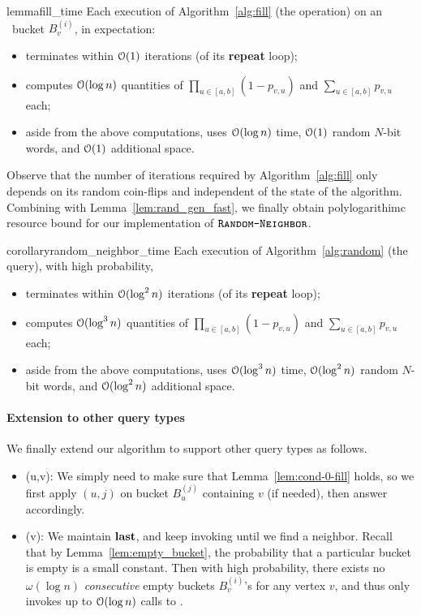 \begin{restatable}{lemma}{fill_time}
\label{lem:fill_time}
Each execution of Algorithm~\ref{alg:fill} (the  operation) on an \unfilled~bucket $B_v^{(i)}$, in expectation:
\begin{itemize}
\item terminates within $\mathcal{O}(1)$ iterations (of its \textup{\textbf{repeat}} loop);
\item computes $\mathcal{O}(\log n)$ quantities of $\prod_{u \in [a,b]} (1-p_{v,u})$ and $\sum_{u\in[a,b]} p_{v,u}$ each;
\item aside from the above computations, uses $\mathcal{O}(\log n)$ time, $\mathcal{O}(1)$ random $N$-bit words, and $\mathcal{O}(1)$ additional space.
\end{itemize}
\end{restatable}

Observe that the number of iterations required by Algorithm~\ref{alg:fill} only depends on its random coin-flips and independent of the state of the algorithm.
Combining with Lemma~\ref{lem:rand_gen_fast}, we finally obtain polylogarithimc resource bound for our implementation of $\texttt{\textsc{Random-Neighbor}}$.

\begin{restatable}{corollary}{random_neighbor_time}
\label{cor:random_neighbor_time}
Each execution of Algorithm~\ref{alg:random} (the  query), with high probability,
\begin{itemize}
\item terminates within $\mathcal{O}(\log^2 n)$ iterations (of its \textup{\textbf{repeat}} loop);
\item computes $\mathcal{O}(\log^3 n)$ quantities of $\prod_{u \in [a,b]} (1-p_{v,u})$ and $\sum_{u\in[a,b]} p_{v,u}$ each;
\item aside from the above computations, uses $\mathcal{O}(\log^3 n)$ time, $\mathcal{O}(\log^2 n)$ random $N$-bit words, and $\mathcal{O}(\log^2 n)$ additional space.
\end{itemize}
\end{restatable}

\paragraph*{Extension to other query types}
We finally extend our algorithm to support other query types as follows.
\begin{itemize}
\item {}(u,v): We simply need to make sure that Lemma~\ref{lem:cond-0-fill} holds, so we first apply $(u,j)$ on bucket $B_u^{(j)}$ containing $v$ (if needed), then answer accordingly.
\item {}(v): We maintain $\mathbf{last}$, and keep invoking  until we find a neighbor. Recall that by Lemma~\ref{lem:empty_bucket}, the probability that a particular bucket is empty is a small constant. Then with high probability, there exists no $\omega(\log n)$ \emph{consecutive} empty buckets $B_v^{(i)}$'s for any vertex $v$, and thus  only invokes up to $\mathcal{O}(\log n)$ calls to .
\end{itemize}

